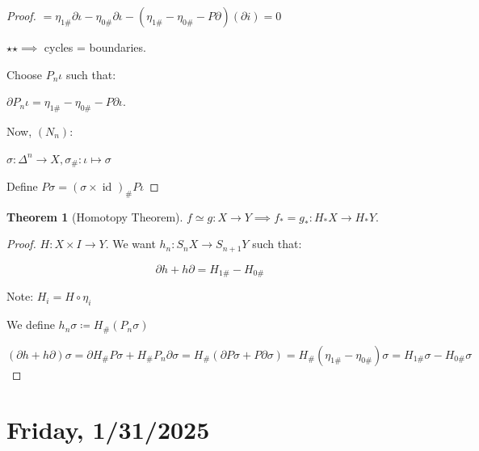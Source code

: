 \documentclass{article}
\theoremstyle{definition}
\newtheorem{theorem}{Theorem}
\begin{document}
\begin{proof}
        \(= \eta_{1\#} \partial \iota - \eta_{0\#} \partial \iota -(\eta_{1\#} - \eta_{0\#} - P \partial)(\partial i) = 0\) 

        \(\star\star \implies\) cycles = boundaries.

        Choose \(P_n \iota\) such that:

        \(\partial P_n \iota = \eta_{1\#} - \eta_{0\#} - P \partial \iota\).

        
        Now, \((N_n)\):

        \(\sigma : \Delta^n \to X, \sigma_\#: \iota \mapsto \sigma\)

        \begin{center}
        \end{center}

        Define \(P \sigma = (\sigma \times \operatorname{id}_{})_\# P \iota\) 

    \end{proof}
    

    \begin{theorem}
        [Homotopy Theorem] \(f\simeq g: X \to Y \implies f_{\ast} = g_{\ast} : H_{\ast} X \to H_{\ast} Y\).
    \end{theorem}

    \begin{proof}
        \(H: X \times I \to Y\). We want \(h_n: S_n X \to S_{n+1} Y\) such that:
        
        \[
            \partial h + h \partial = H_{1\#} - H_{0\#}
        \]

        Note: \(H_i = H \circ \eta_i\)

        We define \(h_n \sigma \coloneqq H_\# (P_n \sigma)\) 

        \((\partial h + h \partial)\sigma = \partial H_\# P \sigma + H_\# P_n \partial \sigma = H_\# (\partial P \sigma + P \partial \sigma) = H_\# (\eta_{1\#} - \eta_{0\#})\sigma = H_{1\#}\sigma - H_{0\#}\sigma\) 
    \end{proof}

    \section*{Friday, 1/31/2025}
    
\end{document}
